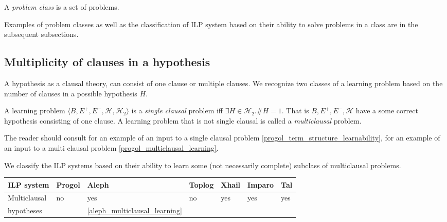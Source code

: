 \begin{defn}
A \emph{problem class} is a set of problems.
\end{defn}

Examples of problem classes as well as the classification of ILP system based on their ability to solve problems in a class are in the subsequent subsections.

\subsection{Multiplicity of clauses in a hypothesis}
A hypothesis as a clausal theory, can consist of one clause or multiple clauses. 
We recognize two classes of a learning problem based on the number of clauses in a possible hypothesis $H$.

\begin{defn}
A learning problem $\langle B, E^+, E^-, \mathcal{H}, \mathcal{H}_2 \rangle$ is a 
\emph{single clausal} problem iff $\exists H \in \mathcal{H}_2. \#H = 1$. That is $B, E^+, E^-, \mathcal{H}$ have a some correct hypothesis consisting of one clause.
A learning problem that is not single clausal is called a \emph{multiclausal} problem.
\end{defn}

The reader should consult for an example of an input to a single clausal problem \ref{progol_term_structure_learnability}, for an example of an input to a multi clausal problem \ref{progol_multiclausal_learning}.

We classify the ILP systems based on their ability to learn some (not necessarily complete) subclass of multiclausal problems.

\begin{center}
 \label{classification_multiclausal_hypotheses} 
\begin{tabular}{| l | l | l | l | l | l | l |}
    \hline
    ILP system & Progol & Aleph & Toplog & Xhail & Imparo & Tal \\ \hline
    Multiclausal& no & yes & no & 
    yes & yes & yes \\ 
     hypotheses & \cite{muggleton2012mc}&\ref{aleph_multiclausal_learning}&
     \cite{muggleton2012mc}&\cite{muggleton2012mc}&\cite{muggleton2012mc}&
     \cite{muggleton2012mc}\\ 
    \hline
\end{tabular}
\end{center}

